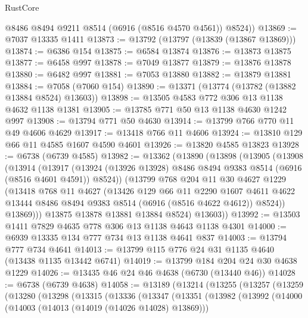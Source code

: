 \begin{lexlean}{RustCore}
\begin{coremodule}
        @8486
        @8494
        @9211
        @8514
        (@6916 (@8516 @4570 @4561))
        @8524))
@13869 := @7037 @13335 @1411
@13873 := @13792 (@13797 (@13839 (@13867 @13869)))
@13874 := @6386 @154
@13875 := @6584 @13874
@13876 := @13873 @13875
@13877 := @6458 @997
@13878 := @7049 @13877
@13879 := @13876 @13878
@13880 := @6482 @997
@13881 := @7053 @13880
@13882 := @13879 @13881
@13884 := @7058 (@7060 @154)
@13890 := @13371 (@13774 (@13782 (@13882 @13884 @8524) @13603))
@13898 := @13505 @4583 @772 @306 @13 @1138 @4632 @1138 @1381
@13905 := @13785 @771 @50 @13 @1138 @4630 @1242 @997
@13908 := @13794 @771 @50 @4630
@13914 := @13799 @766 @770 @11 @49 @4606 @4629
@13917 := @13418 @766 @11 @4606
@13924 := @13810 @129 @66 @11 @4585 @1607 @4590 @4601
@13926 := @13820 @4585 @13823
@13928 := @6738 (@6739 @4585)
@13982 := @13362
    (@13890
      (@13898
        (@13905
          (@13908
            (@13914
              (@13917
                (@13924 (@13926 @13928) @8486 @8494 @9383 @8514 (@6916 (@8516 @4601 @4591)) @8524))
              (@13799
                @768
                @204
                @11
                @30
                @4627
                @1229
                (@13418
                  @768
                  @11
                  @4627
                  (@13426
                    @129
                    @66
                    @11
                    @2290
                    @1607
                    @4611
                    @4622
                    @13444
                    @8486
                    @8494
                    @9383
                    @8514
                    (@6916 (@8516 @4622 @4612))
                    @8524))
                @13869)))
          @13875
          @13878
          @13881
          @13884
          @8524)
        @13603))
@13992 := @13503 @1411 @7829 @4635 @778 @306 @13 @1138 @4643 @1138 @4301
@14000 := @6939 @13335 @134 @777 @734 @13 @1138 @4641 @837
@14003 := @13794 @777 @734 @4641
@14013 := @13799 @115 @776 @24 @31 @1135 @4640 (@13438 @1135 @13442 @6741)
@14019 := @13799 @184 @204 @24 @30 @4638 @1229
@14026 := @13435 @46 @24 @46 @4638 (@6730 (@13440 @46))
@14028 := @6738 (@6739 @4638)
@14058 := @13189
    (@13214
      (@13255
        (@13257
          (@13259
            (@13280
              (@13298
                (@13315
                  (@13336
                    (@13347
                      (@13351
                        (@13982
                          (@13992
                            (@14000
                              (@14003 (@14013 (@14019 (@14026 @14028) @13869)))

\end{coremodule}
\end{lexlean}
